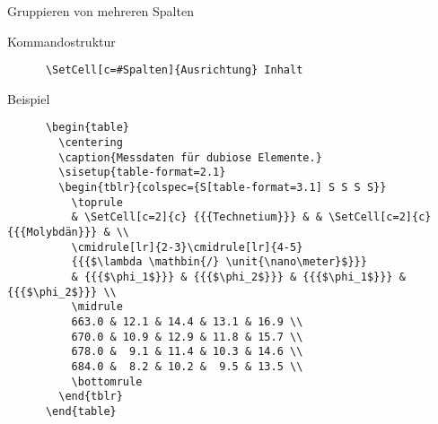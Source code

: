 \begin{frame}[fragile]{Gruppieren von mehreren Spalten}
  \begin{block}{Kommandostruktur}
    \begin{verbatim}
      \SetCell[c=#Spalten]{Ausrichtung} Inhalt
    \end{verbatim}
  \end{block}
  \fontsize{8}{6}
  \begin{block}{Beispiel}
    \begin{verbatim}
      \begin{table}
        \centering
        \caption{Messdaten für dubiose Elemente.}
        \sisetup{table-format=2.1}
        \begin{tblr}{colspec={S[table-format=3.1] S S S S}}
          \toprule
          & \SetCell[c=2]{c} {{{Technetium}}} & & \SetCell[c=2]{c} {{{Molybdän}}} & \\
          \cmidrule[lr]{2-3}\cmidrule[lr]{4-5}
          {{{$\lambda \mathbin{/} \unit{\nano\meter}$}}}
          & {{{$\phi_1$}}} & {{{$\phi_2$}}} & {{{$\phi_1$}}} & {{{$\phi_2$}}} \\
          \midrule
          663.0 & 12.1 & 14.4 & 13.1 & 16.9 \\
          670.0 & 10.9 & 12.9 & 11.8 & 15.7 \\
          678.0 &  9.1 & 11.4 & 10.3 & 14.6 \\
          684.0 &  8.2 & 10.2 &  9.5 & 13.5 \\
          \bottomrule
        \end{tblr}
      \end{table}
    \end{verbatim}
  \end{block}
\end{frame}

